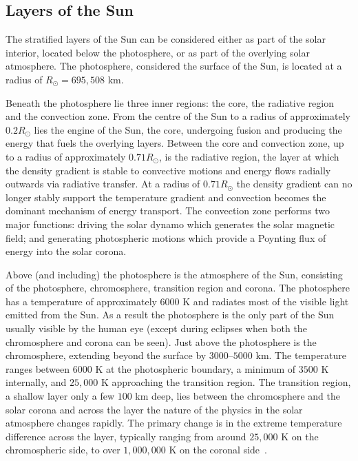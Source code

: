 \subsection{Layers of the Sun}

The stratified layers of the Sun can be considered either as part of the solar interior, located below the photosphere, or as part of the overlying solar atmosphere. The photosphere, considered the surface of the Sun, is located at a radius of $R_{\odot} = 695,508$ km.

Beneath the photosphere lie three inner regions: the core, the radiative region and the convection zone. From the centre of the Sun to a radius of approximately $0.2 R_{\odot}$ lies the engine of the Sun, the core, undergoing fusion and producing the energy that fuels the overlying layers. Between the core and convection zone, up to a radius of approximately  $0.71R_{\odot}$, is the radiative region, the layer at which the density gradient is stable to convective motions and energy flows radially outwards via radiative transfer. At a radius of $0.71R_{\odot}$ the density gradient can no longer stably support the temperature gradient and convection becomes the dominant mechanism of energy transport. The convection zone performs two major functions: driving the solar dynamo which generates the solar magnetic field; and generating photospheric motions which provide a Poynting flux of energy into the solar corona.

Above (and including) the photosphere is the atmosphere of the Sun, consisting of the photosphere, chromosphere, transition region and corona. The photosphere has a temperature of approximately $6000$ K and radiates most of the visible light emitted from the Sun. As a result the photosphere is the only part of the Sun usually visible by the human eye (except during eclipses when both the chromosphere and corona can be seen). Just above the photosphere is the chromosphere, extending beyond the surface by $3000$--$5000$ km. The temperature ranges between $6000$ K at the photospheric boundary, a minimum of $3500$ K internally, and $25,000$ K approaching the transition region. The transition region, a shallow layer only a few $100$ km deep, lies between the chromosphere and the solar corona and across the layer the nature of the physics in the solar atmosphere changes rapidly. The primary change is in the extreme temperature difference across the layer, typically ranging from around $25,000$ K on the chromospheric side, to over $1,000,000$ K on the coronal side~\cite{priestMagnetohydrodynamicsSuna,mandriniMagneticFieldPlasma2000}.

